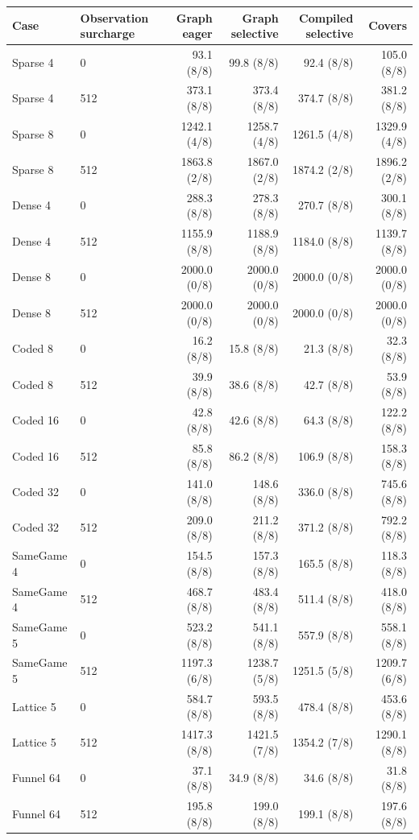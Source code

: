 \begin{center}\small
\begin{tabular}{llrrrr}
\toprule
Case & Observation surcharge & Graph eager & Graph selective & Compiled selective & Covers \\
\midrule
Sparse 4 & 0 & 93.1 (8/8) & 99.8 (8/8) & 92.4 (8/8) & 105.0 (8/8) \\
Sparse 4 & 512 & 373.1 (8/8) & 373.4 (8/8) & 374.7 (8/8) & 381.2 (8/8) \\
Sparse 8 & 0 & 1242.1 (4/8) & 1258.7 (4/8) & 1261.5 (4/8) & 1329.9 (4/8) \\
Sparse 8 & 512 & 1863.8 (2/8) & 1867.0 (2/8) & 1874.2 (2/8) & 1896.2 (2/8) \\
Dense 4 & 0 & 288.3 (8/8) & 278.3 (8/8) & 270.7 (8/8) & 300.1 (8/8) \\
Dense 4 & 512 & 1155.9 (8/8) & 1188.9 (8/8) & 1184.0 (8/8) & 1139.7 (8/8) \\
Dense 8 & 0 & 2000.0 (0/8) & 2000.0 (0/8) & 2000.0 (0/8) & 2000.0 (0/8) \\
Dense 8 & 512 & 2000.0 (0/8) & 2000.0 (0/8) & 2000.0 (0/8) & 2000.0 (0/8) \\
Coded 8 & 0 & 16.2 (8/8) & 15.8 (8/8) & 21.3 (8/8) & 32.3 (8/8) \\
Coded 8 & 512 & 39.9 (8/8) & 38.6 (8/8) & 42.7 (8/8) & 53.9 (8/8) \\
Coded 16 & 0 & 42.8 (8/8) & 42.6 (8/8) & 64.3 (8/8) & 122.2 (8/8) \\
Coded 16 & 512 & 85.8 (8/8) & 86.2 (8/8) & 106.9 (8/8) & 158.3 (8/8) \\
Coded 32 & 0 & 141.0 (8/8) & 148.6 (8/8) & 336.0 (8/8) & 745.6 (8/8) \\
Coded 32 & 512 & 209.0 (8/8) & 211.2 (8/8) & 371.2 (8/8) & 792.2 (8/8) \\
SameGame 4 & 0 & 154.5 (8/8) & 157.3 (8/8) & 165.5 (8/8) & 118.3 (8/8) \\
SameGame 4 & 512 & 468.7 (8/8) & 483.4 (8/8) & 511.4 (8/8) & 418.0 (8/8) \\
SameGame 5 & 0 & 523.2 (8/8) & 541.1 (8/8) & 557.9 (8/8) & 558.1 (8/8) \\
SameGame 5 & 512 & 1197.3 (6/8) & 1238.7 (5/8) & 1251.5 (5/8) & 1209.7 (6/8) \\
Lattice 5 & 0 & 584.7 (8/8) & 593.5 (8/8) & 478.4 (8/8) & 453.6 (8/8) \\
Lattice 5 & 512 & 1417.3 (8/8) & 1421.5 (7/8) & 1354.2 (7/8) & 1290.1 (8/8) \\
Funnel 64 & 0 & 37.1 (8/8) & 34.9 (8/8) & 34.6 (8/8) & 31.8 (8/8) \\
Funnel 64 & 512 & 195.8 (8/8) & 199.0 (8/8) & 199.1 (8/8) & 197.6 (8/8) \\
\bottomrule
\end{tabular}
\end{center}
